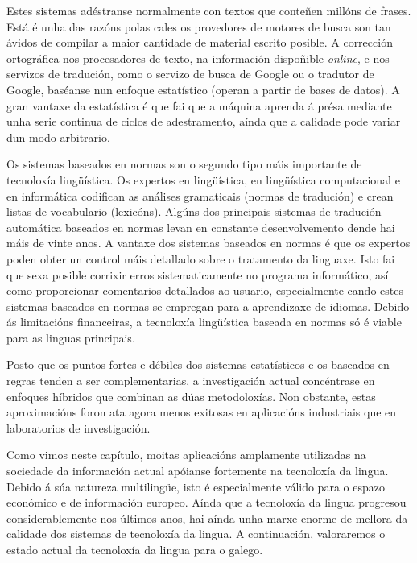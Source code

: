 \begin{multicols}{2}
Estes sistemas adéstranse normalmente con textos que conteñen millóns de frases. Está é unha das razóns polas cales os provedores de motores de busca son tan ávidos de compilar a maior cantidade de material escrito posible. A corrección ortográfica nos procesadores de texto, na información dispoñible \textit{online}, e nos servizos de tradución, como o servizo de busca de Google ou o tradutor de Google, baséanse nun enfoque estatístico (operan a partir de bases de datos).  A gran vantaxe da estatística é que fai que a máquina aprenda á présa mediante unha serie continua de ciclos de adestramento, aínda que a calidade pode variar dun modo arbitrario.

Os sistemas baseados en normas son o segundo tipo máis importante de tecnoloxía lingüística. Os expertos en lingüística, en lingüística computacional e en informática codifican as análises gramaticais (normas de tradución) e crean listas de vocabulario (lexicóns).   Algúns dos principais sistemas de tradución automática baseados en normas levan en constante desenvolvemento dende hai máis de vinte anos. A vantaxe dos sistemas baseados en normas é que os expertos poden obter un control máis detallado sobre o tratamento da linguaxe. Isto fai que sexa posible corrixir erros sistematicamente no programa informático, así como proporcionar comentarios detallados ao usuario, especialmente cando estes sistemas baseados en normas se empregan para a aprendizaxe de idiomas. Debido ás limitacións financeiras, a tecnoloxía lingüística baseada en normas só é viable para as linguas principais. 


Posto que os puntos fortes e débiles dos sistemas estatísticos e os baseados en regras tenden a ser complementarias, a investigación actual concéntrase en enfoques  híbridos que combinan as dúas metodoloxías. Non obstante, estas aproximacións foron ata agora  menos exitosas en aplicacións industriais que en laboratorios de investigación.

Como vimos neste capítulo, moitas aplicacións amplamente utilizadas na sociedade da información actual apóianse fortemente na tecnoloxía da lingua. Debido á  súa natureza multilingüe, isto é especialmente válido para o espazo económico e de información europeo. Aínda que a tecnoloxía da lingua progresou considerablemente nos últimos anos, hai aínda unha marxe enorme de mellora da calidade dos sistemas de tecnoloxía da lingua. A continuación, valoraremos o estado actual da tecnoloxía da lingua para o galego.
\end{multicols}

